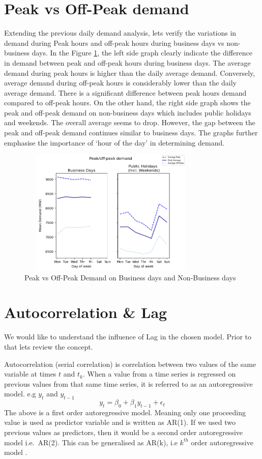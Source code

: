 \documentclass[mstat,12pt]{unswthesis}
\begin{document}
\section{Peak vs Off-Peak demand}\label{peak-vs-off-peak-demand}

Extending the previous daily demand analysis, lets verify the variations
in demand during Peak hours and off-peak hours during business days vs
non-business days. In the Figure \ref{holiday_nonholiday}, the left side
graph clearly indicate the difference in demand between peak and
off-peak hours during business days. The average demand during peak
hours is higher than the daily average demand. Conversely, average
demand during off-peak hours is considerably lower than the daily
average demand. There is a significant difference between peak hours
demand compared to off-peak hours. On the other hand, the right side
graph shows the peak and off-peak demand on non-business days which
includes public holidays and weekends. The overall average seems to
drop. However, the gap between the peak and off-peak demand continues
similar to business days. The graphs further emphasise the importance of
`hour of the day' in determining demand.

\begin{figure}[H]
\centering
\includegraphics[width=0.80\textwidth,height=6cm]{holiday_nonholiday.png}
\caption{Peak vs Off-Peak Demand on Business days and Non-Business days}
\label{holiday_nonholiday}
\end{figure}

\section{Autocorrelation \& Lag}\label{autocorrelation-lag}

We would like to understand the influence of Lag in the chosen model.
Prior to that lets review the concept.

Autocorrelation (serial correlation) is correlation between two values
of the same variable at times \(t\) and \(t_k\). When a value from a
time series is regressed on previous values from that same time series,
it is referred to as an autoregressive model. e.g \(y_t\) and
\(y_{t-1}\) \[ 
y_t = \beta_0 + \beta_1 y_{t-1} + \epsilon_t
\] The above is a first order autoregressive model. Meaning only one
proceeding value is used as predictor variable and is written as AR(1).
If we used two previous values as predictors, then it would be a second
order autoregressive model i.e.~AR(2). This can be generalised as AR(k),
i.e \(k^{th}\) order autoregressive model
\cite{thepennsylvaniastateuniversity_102}.
\end{document}
